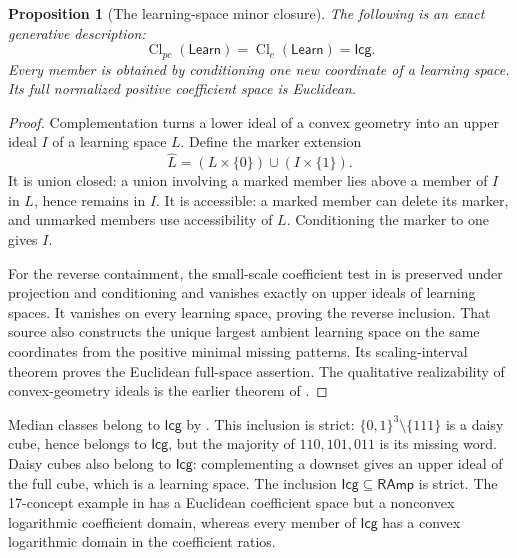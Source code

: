 \documentclass[11pt]{article}
\newtheorem{proposition}{Proposition}[section]
\theoremstyle{definition}
\newcommand{\bits}{\{0,1\}}
\newcommand{\RAmp}{\mathsf{RAmp}}
\newcommand{\Cl}{\operatorname{Cl}}
\begin{document}
\begin{proposition}[The learning-space minor closure]\label{prop:learning-ideal-closure}
The following is an exact generative description:
\[
 \Cl_{pc}(\mathsf{Learn})=\Cl_c(\mathsf{Learn})=\mathsf{Icg}.
\]
Every member is obtained by conditioning one new coordinate of a learning
space. Its full normalized positive coefficient space is Euclidean.
\end{proposition}
\begin{proof}
Complementation turns a lower ideal of a convex geometry into an upper
ideal $I$ of a learning space $L$. Define the marker extension
\[
 \widehat L=(L\times\{0\})\cup(I\times\{1\}).
\]
It is union closed: a union involving a marked member lies above a member
of $I$ in $L$, hence remains in $I$. It is accessible: a marked member can
delete its marker, and unmarked members use accessibility of $L$.
Conditioning the marker to one gives $I$.

For the reverse containment, the small-scale coefficient test in
\cite[Theorems~2--3]{CoefficientScaling} is preserved under projection and
conditioning and vanishes exactly on upper ideals of learning spaces. It
vanishes on every learning space, proving the reverse inclusion. That source
also constructs the unique largest ambient learning space on the same coordinates from the positive
minimal missing patterns. Its scaling-interval theorem proves the Euclidean
full-space assertion. The qualitative realizability of convex-geometry ideals
is the earlier theorem of \cite[Theorem~26]{CCKGeometry}.
\end{proof}

Median classes belong to $\mathsf{Icg}$ by
\cite[Corollary~25]{CCKGeometry}. This inclusion is strict:
$\bits^3\setminus\{111\}$ is a daisy cube, hence belongs to
$\mathsf{Icg}$, but the majority of $110,101,011$ is its missing word.
Daisy cubes also belong to $\mathsf{Icg}$: complementing a downset gives
an upper ideal of the full cube, which is a learning space. The inclusion
$\mathsf{Icg}\subseteq\RAmp$ is strict. The 17-concept example in
\cite{CoefficientScaling} has a Euclidean coefficient space but a nonconvex
logarithmic coefficient domain, whereas every member of $\mathsf{Icg}$ has
a convex logarithmic domain in the coefficient ratios.
\end{document}
